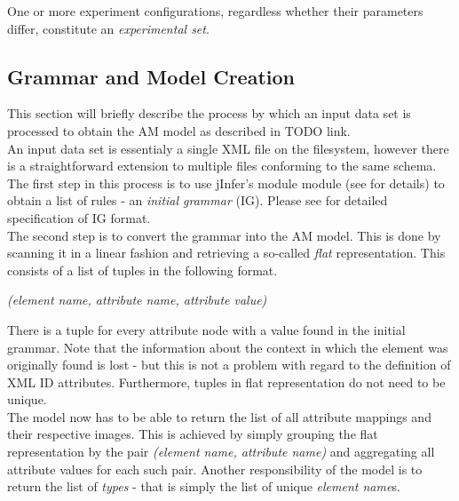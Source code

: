 \begin{define}
	\label{define-experiment-set}
	One or more experiment configurations, regardless whether their parameters differ, constitute an \textit{experimental set}.
\end{define}

\subsection{Grammar and Model Creation}

This section will briefly describe the process by which an input data set is processed to obtain the AM model as described in TODO link.\\

An input data set is essentialy a single XML file on the filesystem, however there is a straightforward extension to multiple files conforming to the same schema. The first step in this process is to use jInfer's module  module (see \cite{basiciggdoc} for details) to obtain a list of rules - an \textit{initial grammar} (IG). 
Please see \cite{archdoc} for detailed specification of IG format.\\

The second step is to convert the grammar into the AM model. This is done by scanning it in a linear fashion and retrieving a so-called \textit{flat} representation. This consists of a list of tuples in the following format.

\begin{center}
\textit{(element name, attribute name, attribute value)}
\end{center}

There is a tuple for every attribute node with a value found in the initial grammar. Note that the information about the context in which the element was originally found is lost - but this is not a problem with regard to the definition of XML ID attributes. Furthermore, tuples in flat representation do not need to be unique.\\

The model now has to be able to return the list of all attribute mappings and their respective images. This is achieved by simply grouping the flat representation by the pair \textit{(element name, attribute name)} and aggregating all attribute values for each such pair. Another responsibility of the model is to return the list of \textit{types} - that is simply the list of unique \textit{element name}s.

